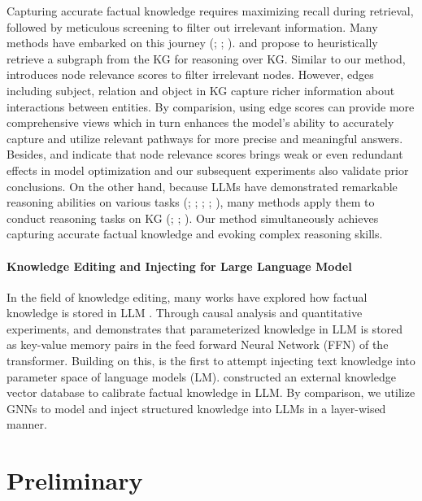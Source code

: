 \documentclass[11pt]{article}
\begin{document}
Capturing accurate factual knowledge requires maximizing recall during retrieval, followed by meticulous screening to filter out irrelevant information. Many methods have embarked on this journey (\citealp{unik1}; \citealp{unik2}; \citealp{graph_reasoning}). \citealt{kagnet} and \citealt{greaselm} propose to heuristically retrieve a subgraph from the KG for reasoning over KG. Similar to our method, \citealt{qagnn} introduces node relevance scores to filter irrelevant nodes. However, edges including subject, relation and object in KG capture richer information about interactions between entities. By comparision, using edge scores can provide more comprehensive views which in turn enhances the model's ability to accurately capture and utilize relevant pathways for more precise and meaningful answers. Besides, \citealt{great} and \citealt{counter} indicate that node relevance scores brings weak or even redundant effects in model optimization and our subsequent experiments also validate prior conclusions. On the other hand, because LLMs have demonstrated remarkable reasoning abilities on various tasks (\citealp{llm1}; \citealp{benchmark}; \citealp{llm2}; \citealp{dual}; \citealp{translation1}), many methods apply them to conduct reasoning tasks on KG (\citealp{rog}; \citealp{knowgpt}; \citealp{gnp}). Our method simultaneously achieves capturing accurate factual knowledge and evoking complex reasoning skills.

\paragraph{Knowledge Editing and Injecting for Large Language Model}
In the field of knowledge editing, many works have explored how factual knowledge is stored in LLM \cite{rome,edit2,edit3}. 
Through causal analysis and quantitative experiments, \citealp{ffn1} and \citealp{ffn2} demonstrates that parameterized knowledge in LLM is stored as key-value memory pairs in the feed forward Neural Network (FFN) of the transformer. 
Building on this, \citealp{kformer} is the first to attempt injecting text knowledge into parameter space of language models (LM). 
\citealp{calibrating} constructed an external knowledge vector database to calibrate factual knowledge in LLM. 
By comparison, we utilize GNNs to model and inject structured knowledge into LLMs in a layer-wised manner.


 \section{Preliminary}
\end{document}
